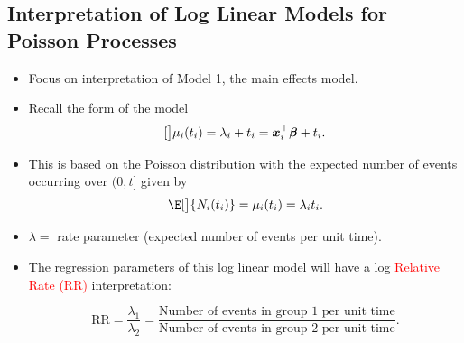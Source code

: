 \documentclass{article}\usepackage[]{graphicx}\usepackage[svgnames]{xcolor}
\let\log\relax%
\newcommand{\RR}{\text{RR}}%
\providecommand{\Vector}[1]{\bm{#1}}%
\begin{document}
\subsection*{Interpretation of Log Linear Models for Poisson Processes}
\begin{itemize}
    \item Focus on interpretation of Model 1, the main effects model.
    \item Recall the form of the model
          \[ \log[\big]{\mu_i(t_i)}=\log{\lambda_i}+\log{t_i}=\Vector{x}_i^\top \Vector{\beta}+\log{t_i}. \]
    \item This is based on the Poisson distribution with the expected number of events
          occurring over $ (0,t] $ given by
          \[ \E[\big]{N_i(t_i)}=\mu_i(t_i)=\lambda_i t_i. \]
    \item $ \lambda= $ rate parameter (expected number of events per unit time).
    \item The regression parameters of this log linear model will have a log \textcolor{Red}{Relative Rate (RR)} interpretation:
          \begin{Regular}{}
              \[ \RR = \frac{\lambda_1}{\lambda_2}=\frac{\text{Number of events in group 1 per unit time}}{\text{Number of events in group 2 per unit time}}. \]
          \end{Regular}
\end{itemize}
\end{document}
